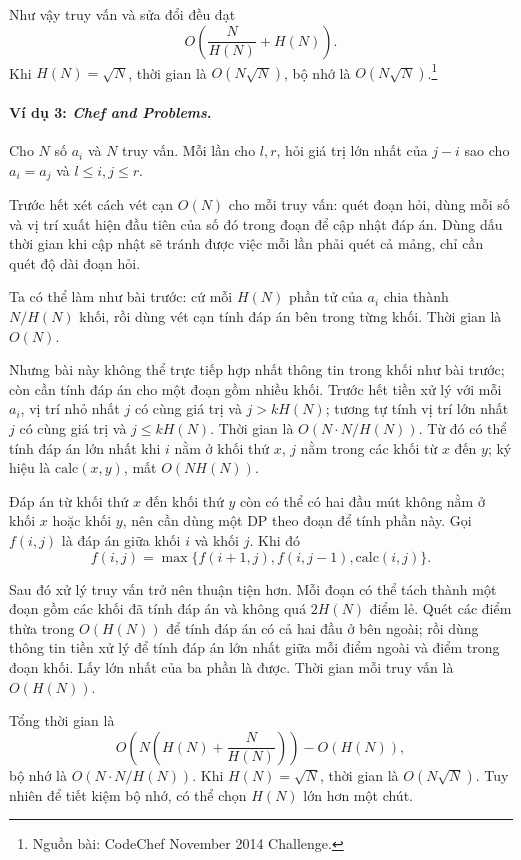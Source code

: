 \documentclass[11pt]{article}
\begin{document}
Như vậy truy vấn và sửa đổi đều đạt
\[
  O\left(\frac{N}{H(N)}+H(N)\right).
\]
Khi \(H(N)=\sqrt N\), thời gian là \(O(N\sqrt N)\), bộ nhớ là
\(O(N\sqrt N)\).\footnote{Nguồn bài: CodeChef November 2014 Challenge.}

\paragraph{Ví dụ 3: \emph{Chef and Problems}.}
Cho \(N\) số \(a_i\) và \(N\) truy vấn. Mỗi lần cho \(l,r\), hỏi giá trị lớn nhất
của \(j-i\) sao cho \(a_i=a_j\) và \(l\le i,j\le r\).

Trước hết xét cách vét cạn \(O(N)\) cho mỗi truy vấn: quét đoạn hỏi, dùng mỗi số
và vị trí xuất hiện đầu tiên của số đó trong đoạn để cập nhật đáp án. Dùng dấu
thời gian khi cập nhật sẽ tránh được việc mỗi lần phải quét cả mảng, chỉ cần
quét độ dài đoạn hỏi.

Ta có thể làm như bài trước: cứ mỗi \(H(N)\) phần tử của \(a_i\) chia thành
\(N/H(N)\) khối, rồi dùng vét cạn tính đáp án bên trong từng khối. Thời gian là
\(O(N)\).

Nhưng bài này không thể trực tiếp hợp nhất thông tin trong khối như bài trước;
còn cần tính đáp án cho một đoạn gồm nhiều khối. Trước hết tiền xử lý với mỗi
\(a_i\), vị trí nhỏ nhất \(j\) có cùng giá trị và \(j>kH(N)\); tương tự tính vị
trí lớn nhất \(j\) có cùng giá trị và \(j\le kH(N)\). Thời gian là
\(O(N\cdot N/H(N))\). Từ đó có thể tính đáp án lớn nhất khi \(i\) nằm ở khối
thứ \(x\), \(j\) nằm trong các khối từ \(x\) đến \(y\); ký hiệu là
\(\mathrm{calc}(x,y)\), mất \(O(NH(N))\).

Đáp án từ khối thứ \(x\) đến khối thứ \(y\) còn có thể có hai đầu mút không nằm
ở khối \(x\) hoặc khối \(y\), nên cần dùng một DP theo đoạn để tính phần này.
Gọi \(f(i,j)\) là đáp án giữa khối \(i\) và khối \(j\). Khi đó
\[
  f(i,j)=\max\{f(i+1,j), f(i,j-1), \mathrm{calc}(i,j)\}.
\]

Sau đó xử lý truy vấn trở nên thuận tiện hơn. Mỗi đoạn có thể tách thành một
đoạn gồm các khối đã tính đáp án và không quá \(2H(N)\) điểm lẻ. Quét các điểm
thừa trong \(O(H(N))\) để tính đáp án có cả hai đầu ở bên ngoài; rồi dùng thông
tin tiền xử lý để tính đáp án lớn nhất giữa mỗi điểm ngoài và điểm trong đoạn
khối. Lấy lớn nhất của ba phần là được. Thời gian mỗi truy vấn là \(O(H(N))\).

Tổng thời gian là
\[
  O\left(N\left(H(N)+\frac{N}{H(N)}\right)\right)-O(H(N)),
\]
bộ nhớ là \(O(N\cdot N/H(N))\). Khi \(H(N)=\sqrt N\), thời gian là
\(O(N\sqrt N)\). Tuy nhiên để tiết kiệm bộ nhớ, có thể chọn \(H(N)\) lớn hơn
một chút.
\end{document}
